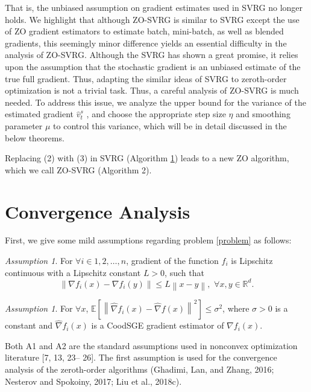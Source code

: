 \documentclass{article}
\newcommand*{\R}{\mathbb{R}}
\newcommand*{\E}{\mathbb{E}}
\newcommand{\norm}[1]{\left\lVert#1\right\rVert}
\theoremstyle{definition}
\theoremstyle{remark}
\newtheorem{assumption}[theorem]{Assumption}
\begin{document}
{{{\color{Brown} That is, the unbiased assumption on gradient estimates used in SVRG no longer holds. We highlight that although ZO-SVRG is similar
to SVRG except the use of ZO gradient estimators to estimate batch, mini-batch, as well as blended
gradients, this seemingly minor difference yields an essential difficulty in the analysis of ZO-SVRG.
}
Although the SVRG has shown a great promise, it relies upon the
assumption that the stochastic gradient is an unbiased estimate of the true full gradient. Thus, adapting the similar ideas of SVRG to zeroth-order optimization is not a trivial task. {\color{Brown} Thus, a careful analysis of ZO-SVRG is much needed.} To address this issue, we analyze the upper bound for the variance of the estimated gradient $\hat{v}_t^s$ , and choose the appropriate step size $\eta$ and smoothing parameter $\mu$ to control
this variance, which will be in detail discussed in the below theorems.
}
}
{\color{Brown}
 

 Replacing (2) with (3) in SVRG (Algorithm \ref{}) leads to a new ZO
algorithm, which we call ZO-SVRG (Algorithm 2). 
 
}
\section{Convergence Analysis}
{\color{Green}
First, we give some
mild assumptions regarding problem \eqref{problem} as follows:
}
\begin{assumption}\label{Lip-Zoo}
For $\forall i\in{1,2,\ldots,n}$, gradient of the function $f_i$ is Lipschitz continuous with a Lipschitz constant $L > 0$, such that 
\[
\norm{\nabla f_i(x) - \nabla f_i(y)}\leq L \norm{x-y},\,\,\forall x,y\in\R^d.
\]
\end{assumption}

\begin{assumption}\label{Var-Zoo}
For $\forall x$, $\E\left[\norm{\hat{\nabla} f_i(x) - \hat{\nabla} f(x)}^2\right] \leq \sigma^2$, where $\sigma > 0$ is a constant and $\hat{\nabla} f_i(x)$ is a CoodSGE gradient estimator of $\nabla f_i(x)$.
\end{assumption}
{\color{Green}
{\color{Brown}
Both A1 and A2 are the standard assumptions used in nonconvex optimization literature [7, 13, 23–
26].}
The first assumption is used for the convergence analysis of the zeroth-order algorithms (Ghadimi, Lan, and Zhang, 2016; Nesterov and Spokoiny, 2017; Liu et al., 2018c).}
\end{document}
